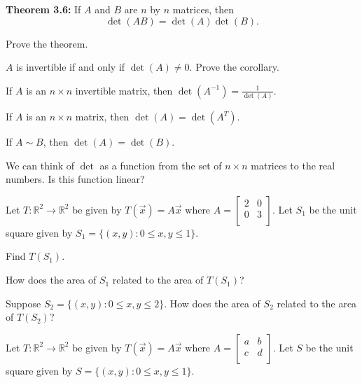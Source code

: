 \newpage

{\bf Theorem 3.6:} If $A$ and $B$ are $n$ by $n$ matrices, then $$\operatorname{det}(AB)=\operatorname{det}(A)\operatorname{det}(B).$$

\begin{enumerate}



\Problem Prove the theorem.

\vfill
\vfill

 $A$ is invertible if and only if $\operatorname{det}(A)\neq0$. Prove the corollary.

\vfill

\newpage


\Part If $A$ is an $n\times n$ invertible matrix, then $\operatorname{det}(A^{-1})=\frac{1}{\operatorname{det}(A)}$.

\vfill

\Part If $A$ is an $n\times n$ matrix, then $\operatorname{det}(A)=\operatorname{det}(A^{T})$.

\vfill

\Part If $A \sim B$, then $\operatorname{det}(A)=\operatorname{det}(B)$.

\vfill

\Problem We can think of $\operatorname{det}$ as a function from the set of $n\times n$ matrices to the real numbers. Is this function linear?

\vfill

\newpage


\Problem Let $T:\mathbb{R}^2 \to \mathbb{R}^2$ be given by $T(\vec{x})=A\vec{x}$ where $A=\begin{bmatrix} 2 & 0\\ 0 & 3\\ \end{bmatrix}$. Let $S_1$ be the unit square given by $S_1=\{(x,y) : 0\leq x, y \leq 1\}$. 

\Part Find $T(S_1)$.

\vfill

\Part How does the area of $S_1$ related to the area of $T(S_1)$?

\vfill

\Part Suppose $S_2=\{(x,y) : 0\leq x, y \leq 2\}$. How does the area of $S_2$ related to the area of $T(S_2)$?

\vfill

\newpage

\Problem Let $T:\mathbb{R}^2 \to \mathbb{R}^2$ be given by $T(\vec{x})=A\vec{x}$ where $A=\begin{bmatrix} a & b\\ c & d\\ \end{bmatrix}$. Let $S$ be the unit square given by $S=\{(x,y) : 0\leq x, y \leq 1\}$. 


\end{enumerate}
